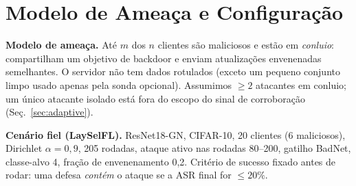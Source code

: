 \section{Modelo de Ameaça e Configuração}\label{sec:setup}
\textbf{Modelo de ameaça.} Até $m$ dos $n$ clientes são maliciosos e estão em \emph{conluio}:
compartilham um objetivo de backdoor e enviam atualizações envenenadas semelhantes. O servidor
não tem dados rotulados (exceto um pequeno conjunto limpo usado apenas pela sonda opcional).
Assumimos $\geq 2$ atacantes em conluio; um único atacante isolado está fora do escopo do sinal
de corroboração (Seç.~\ref{sec:adaptive}).

\textbf{Cenário fiel (LaySelFL).} ResNet18-GN, CIFAR-10, 20 clientes (6 maliciosos), Dirichlet
$\alpha{=}0{,}9$, 205 rodadas, ataque ativo nas rodadas 80--200, gatilho BadNet, classe-alvo 4,
fração de envenenamento 0{,}2. Critério de sucesso fixado antes de rodar: uma defesa
\emph{contém} o ataque se a ASR final for $\leq 20\%$.
